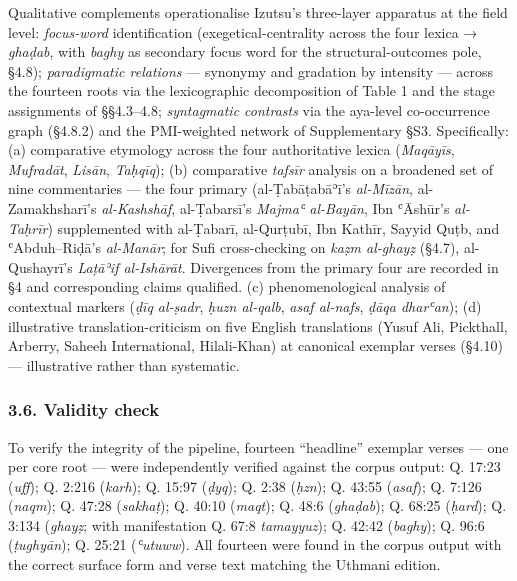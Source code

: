Qualitative complements operationalise Izutsu's three-layer apparatus at
the field level: \emph{focus-word} identification (exegetical-centrality
across the four lexica → \emph{ghaḍab}, with \emph{baghy} as secondary
focus word for the structural-outcomes pole, §4.8); \emph{paradigmatic
relations} --- synonymy and gradation by intensity --- across the
fourteen roots via the lexicographic decomposition of Table 1 and the
stage assignments of §§4.3--4.8; \emph{syntagmatic contrasts} via the
aya-level co-occurrence graph (§4.8.2) and the PMI-weighted network of
Supplementary §S3. Specifically: (a) comparative etymology across the
four authoritative lexica (\emph{Maqāyīs}, \emph{Mufradāt},
\emph{Lisān}, \emph{Taḥqīq}); (b) comparative \emph{tafsīr} analysis on
a broadened set of nine commentaries --- the four primary
(al-Ṭabāṭabāʾī's \emph{al-Mīzān}, al-Zamakhsharī's \emph{al-Kashshāf},
al-Ṭabarsī's \emph{Majmaʿ al-Bayān}, Ibn ʿĀshūr's \emph{al-Taḥrīr})
supplemented with al-Ṭabarī, al-Qurṭubī, Ibn Kathīr, Sayyid Quṭb, and
ʿAbduh--Riḍā's \emph{al-Manār}; for Sufi cross-checking on \emph{kaẓm
al-ghayẓ} (§4.7), al-Qushayrī's \emph{Laṭāʾif al-Ishārāt}. Divergences
from the primary four are recorded in §4 and corresponding claims
qualified. (c) phenomenological analysis of contextual markers
(\emph{ḍīq al-ṣadr}, \emph{ḥuzn al-qalb}, \emph{asaf al-nafs},
\emph{ḍāqa dharʿan}); (d) illustrative translation-criticism on five
English translations (Yusuf Ali, Pickthall, Arberry, Saheeh
International, Hilali-Khan) at canonical exemplar verses (§4.10) ---
illustrative rather than systematic.

\subsubsection{3.6. Validity check}\label{validity-check}

To verify the integrity of the pipeline, fourteen ``headline'' exemplar
verses --- one per core root --- were independently verified against the
corpus output: Q. 17:23 (\emph{uff}); Q. 2:216 (\emph{karh}); Q. 15:97
(\emph{ḍyq}); Q. 2:38 (\emph{ḥzn}); Q. 43:55 (\emph{asaf}); Q. 7:126
(\emph{naqm}); Q. 47:28 (\emph{sakhaṭ}); Q. 40:10 (\emph{maqt}); Q. 48:6
(\emph{ghaḍab}); Q. 68:25 (\emph{ḥard}); Q. 3:134 (\emph{ghayẓ}; with
manifestation Q. 67:8 \emph{tamayyuz}); Q. 42:42 (\emph{baghy}); Q. 96:6
(\emph{ṭughyān}); Q. 25:21 (\emph{ʿutuww}). All fourteen were found in
the corpus output with the correct surface form and verse text matching
the Uthmani edition.

